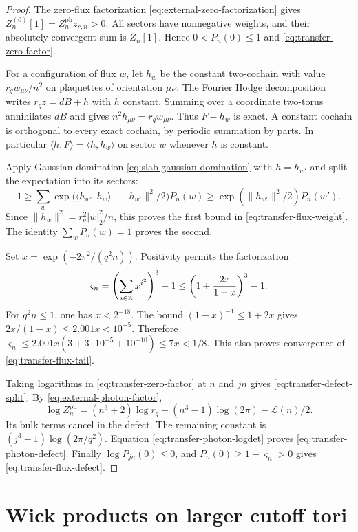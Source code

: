 \begin{proof}
The zero-flux factorization \eqref{eq:external-zero-factorization}
gives $Z_n^{(0)}[1]=Z_n^{\mathrm{ph}}z_{r,n}>0$.
All sectors have nonnegative weights, and their absolutely
convergent sum is $Z_n[1]$. Hence
$0<P_n(0)\le1$ and \eqref{eq:transfer-zero-factor}.

For a configuration of flux $w$, let $h_w$ be the
constant two-cochain with value
$r_qw_{\mu\nu}/n^2$ on plaquettes of orientation $\mu\nu$.
The Fourier Hodge decomposition writes
$r_qz=dB+h$ with $h$ constant.
Summing over a coordinate two-torus annihilates $dB$
and gives $n^2h_{\mu\nu}=r_qw_{\mu\nu}$.
Thus $F-h_w$ is exact. A constant cochain is orthogonal
to every exact cochain, by periodic summation by parts.
In particular $\langle h,F\rangle=\langle h,h_w\rangle$
on sector $w$ whenever $h$ is constant.

Apply Gaussian domination \eqref{eq:slab-gaussian-domination}
with $h=h_{w'}$ and split the expectation into its sectors:
\[
 1\ge\sum_w
 \exp\bigl(\langle h_{w'},h_w\rangle-\|h_{w'}\|^2/2\bigr)P_n(w)
 \ge \exp(\|h_{w'}\|^2/2)P_n(w').
\]
Since $\|h_w\|^2=r_q^2|w|_2^2/n$, this proves the
first bound in \eqref{eq:transfer-flux-weight}.
The identity $\sum_wP_n(w)=1$ proves the second.

Set $x=\exp(-2\pi^2/(q^2n))$. Positivity permits the
factorization
\[
 \varsigma_n=\left(\sum_{i\in\mathbb Z}x^{i^2}\right)^3-1
 \le\left(1+\frac{2x}{1-x}\right)^3-1.
\]
For $q^2n\le1$, one has $x<2^{-18}$.
The bound $(1-x)^{-1}\le1+2x$ gives
$2x/(1-x)\le2.001x<10^{-5}$. Therefore
$\varsigma_n\le2.001x(3+3\cdot10^{-5}+10^{-10})
\le7x<1/8$. This also proves convergence of
\eqref{eq:transfer-flux-tail}.

Taking logarithms in \eqref{eq:transfer-zero-factor}
at $n$ and $jn$ gives \eqref{eq:transfer-defect-split}.
By \eqref{eq:external-photon-factor},
\[
 \log Z_n^{\mathrm{ph}}
   =(n^3+2)\log r_q+(n^3-1)\log(2\pi)-\mathcal L(n)/2.
\]
Its bulk terms cancel in the defect. The remaining
constant is $(j^3-1)\log(2\pi/q^2)$.
Equation \eqref{eq:transfer-photon-logdet} proves
\eqref{eq:transfer-photon-defect}. Finally
$\log P_{jn}(0)\le0$, and
$P_n(0)\ge1-\varsigma_n>0$ gives
\eqref{eq:transfer-flux-defect}.
\end{proof}

\section{Wick products on larger cutoff tori}\label{sec:vtm-wick}

